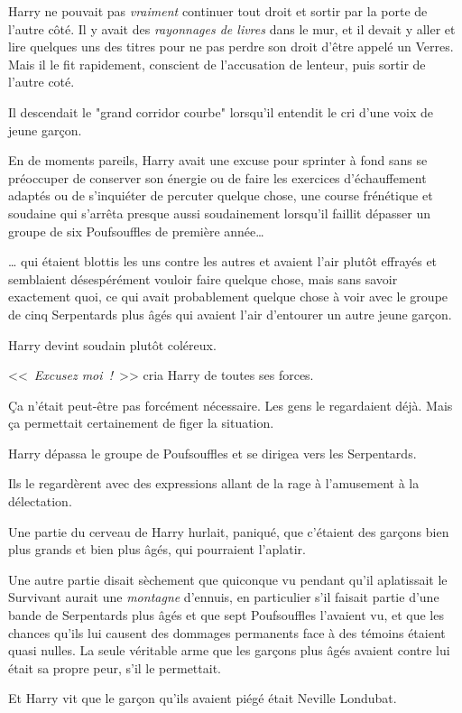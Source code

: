Harry ne pouvait pas \emph{vraiment} continuer tout droit et sortir par la porte de l'autre côté. Il y avait des \emph{rayonnages de livres} dans le mur, et il devait y aller et lire quelques uns des titres pour ne pas perdre son droit d'être appelé un Verres. Mais il le fit rapidement, conscient de l'accusation de lenteur, puis sortir de l'autre coté.

Il descendait le "grand corridor courbe" lorsqu'il entendit le cri d'une voix de jeune garçon.

En de moments pareils, Harry avait une excuse pour sprinter à fond sans se préoccuper de conserver son énergie ou de faire les exercices d'échauffement adaptés ou de s'inquiéter de percuter quelque chose, une course frénétique et soudaine qui s'arrêta presque aussi soudainement lorsqu'il faillit dépasser un groupe de six Poufsouffles de première année…

… qui étaient blottis les uns contre les autres et avaient l'air plutôt effrayés et semblaient désespérément vouloir faire quelque chose, mais sans savoir exactement quoi, ce qui avait probablement quelque chose à voir avec le groupe de cinq Serpentards plus âgés qui avaient l'air d'entourer un autre jeune garçon.

Harry devint soudain plutôt coléreux.

<<~\emph{Excusez moi~!}~>> cria Harry de toutes ses forces.

Ça n'était peut-être pas forcément nécessaire. Les gens le regardaient déjà. Mais ça permettait certainement de figer la situation.

Harry dépassa le groupe de Poufsouffles et se dirigea vers les Serpentards.

Ils le regardèrent avec des expressions allant de la rage à l'amusement à la délectation.

Une partie du cerveau de Harry hurlait, paniqué, que c'étaient des garçons bien plus grands et bien plus âgés, qui pourraient l'aplatir.

Une autre partie disait sèchement que quiconque vu pendant qu'il aplatissait le Survivant aurait une \emph{montagne} d'ennuis, en particulier s'il faisait partie d'une bande de Serpentards plus âgés et que sept Poufsouffles l'avaient vu, et que les chances qu'ils lui causent des dommages permanents face à des témoins étaient quasi nulles. La seule véritable arme que les garçons plus âgés avaient contre lui était sa propre peur, s'il le permettait.

Et Harry vit que le garçon qu'ils avaient piégé était Neville Londubat.


